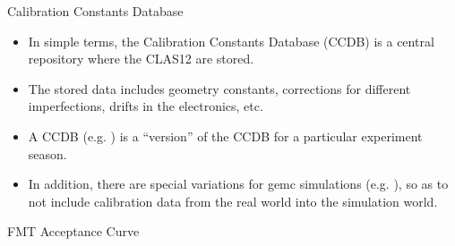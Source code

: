 \begin{frame}{}
    \centering \Huge{}
\end{frame}

\begin{frame}{Calibration Constants Database}
    \label{20.01::ccdb}
    \begin{itemize}
        \item
        \vspace{12pt}
        In simple terms, the Calibration Constants Database (CCDB) is a central repository where the CLAS12  are stored.
        \item
            The stored data includes geometry constants, corrections for different imperfections, drifts in the electronics, etc.

        \vspace{12pt}
        \item
            A CCDB  (e.g. ) is a ``version'' of the CCDB for a particular experiment season.

        \vspace{12pt}
        \item
            In addition, there are special variations for gemc simulations (e.g. ), so as to not include calibration data from the real world into the simulation world.
    \end{itemize}

\end{frame}

\begin{frame}{FMT Acceptance Curve}
    \label{20.02::fmt_acceptance_curve}

\end{frame}

